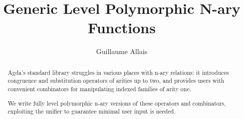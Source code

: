 \documentclass[draft, sigplan, anonymous, review]{acmart}
\begin{document}
\title{}

\title{Generic Level Polymorphic N-ary Functions}

\author{Guillaume Allais}


\begin{abstract}
Agda's standard library struggles in various places with n-ary relations:
it introduces congruence and substitution operators of arities up to two,
and provides users with convenient combinators for manipulating indexed
families of arity one.

We write fully level polymorphic n-ary versions of these operators and
combinators, exploiting the unifier to guarantee minimal user input is
needed.
\end{abstract}

\maketitle





\end{document}
